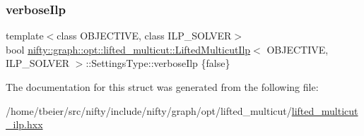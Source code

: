 \subsubsection{\texorpdfstring{verbose\+Ilp}{verboseIlp}}
{\footnotesize\ttfamily template$<$class O\+B\+J\+E\+C\+T\+I\+VE, class I\+L\+P\+\_\+\+S\+O\+L\+V\+ER$>$ \\
bool \hyperlink{classnifty_1_1graph_1_1opt_1_1lifted__multicut_1_1LiftedMulticutIlp}{nifty\+::graph\+::opt\+::lifted\+\_\+multicut\+::\+Lifted\+Multicut\+Ilp}$<$ O\+B\+J\+E\+C\+T\+I\+VE, I\+L\+P\+\_\+\+S\+O\+L\+V\+ER $>$\+::Settings\+Type\+::verbose\+Ilp \{false\}}



The documentation for this struct was generated from the following file\+:\begin{DoxyCompactItemize}
\item 
/home/tbeier/src/nifty/include/nifty/graph/opt/lifted\+\_\+multicut/\hyperlink{lifted__multicut__ilp_8hxx}{lifted\+\_\+multicut\+\_\+ilp.\+hxx}\end{DoxyCompactItemize}
